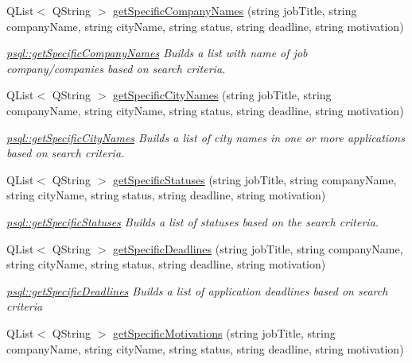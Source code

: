 \begin{DoxyCompactItemize}
Q\+List$<$ Q\+String $>$ \mbox{\hyperlink{classpsql_ac2528de5054ba99371d2d796ed32b2b1}{get\+Specific\+Company\+Names}} (string job\+Title, string company\+Name, string city\+Name, string status, string deadline, string motivation)
\begin{DoxyCompactList}\small\item\em \mbox{\hyperlink{classpsql_ac2528de5054ba99371d2d796ed32b2b1}{psql\+::get\+Specific\+Company\+Names}} Builds a list with name of job company/companies based on search criteria. \end{DoxyCompactList}\item 
Q\+List$<$ Q\+String $>$ \mbox{\hyperlink{classpsql_aace910a1e695138795d6e41765908784}{get\+Specific\+City\+Names}} (string job\+Title, string company\+Name, string city\+Name, string status, string deadline, string motivation)
\begin{DoxyCompactList}\small\item\em \mbox{\hyperlink{classpsql_aace910a1e695138795d6e41765908784}{psql\+::get\+Specific\+City\+Names}} Builds a list of city names in one or more applications based on search criteria. \end{DoxyCompactList}\item 
Q\+List$<$ Q\+String $>$ \mbox{\hyperlink{classpsql_aa04154eae71d7cdfd0fb8ab67ac032e7}{get\+Specific\+Statuses}} (string job\+Title, string company\+Name, string city\+Name, string status, string deadline, string motivation)
\begin{DoxyCompactList}\small\item\em \mbox{\hyperlink{classpsql_aa04154eae71d7cdfd0fb8ab67ac032e7}{psql\+::get\+Specific\+Statuses}} Builds a list of statuses based on the search criteria. \end{DoxyCompactList}\item 
Q\+List$<$ Q\+String $>$ \mbox{\hyperlink{classpsql_a415ebb495b96ac805880401555f72825}{get\+Specific\+Deadlines}} (string job\+Title, string company\+Name, string city\+Name, string status, string deadline, string motivation)
\begin{DoxyCompactList}\small\item\em \mbox{\hyperlink{classpsql_a415ebb495b96ac805880401555f72825}{psql\+::get\+Specific\+Deadlines}} Builds a list of application deadlines based on search criteria \end{DoxyCompactList}\item 
Q\+List$<$ Q\+String $>$ \mbox{\hyperlink{classpsql_a7c86e4ba33784dece1bf897537087a68}{get\+Specific\+Motivations}} (string job\+Title, string company\+Name, string city\+Name, string status, string deadline, string motivation)

\end{DoxyCompactItemize}
